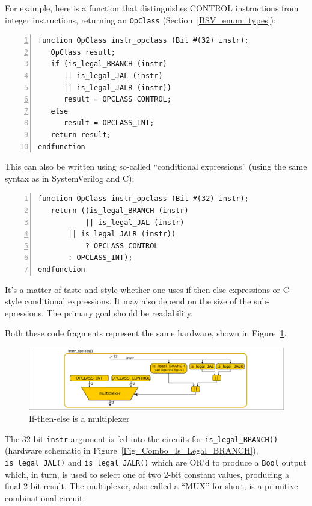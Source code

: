 For example, here is a function that distinguishes CONTROL
instructions from integer instructions, returning an \verb|OpClass|
(Section~\ref{BSV_enum_types}):

{\small
\begin{Verbatim}[frame=single, numbers=left]
function OpClass instr_opclass (Bit #(32) instr);
   OpClass result;
   if (is_legal_BRANCH (instr)
      || is_legal_JAL (instr)
      || is_legal_JALR (instr))
      result = OPCLASS_CONTROL;
   else
      result = OPCLASS_INT;
   return result;
endfunction
\end{Verbatim}
}

This can also be written using so-called ``conditional expressions''
(using the same syntax as in SystemVerilog and C):

{\small
\begin{Verbatim}[frame=single, numbers=left]
function OpClass instr_opclass (Bit #(32) instr);
   return ((is_legal_BRANCH (instr)
           || is_legal_JAL (instr)
	   || is_legal_JALR (instr))
           ? OPCLASS_CONTROL
	   : OPCLASS_INT);
endfunction
\end{Verbatim}
}

It's a matter of taste and style whether one uses if-then-else
expressions or C-style conditional expressions.  It may also depend on
the size of the sub-epressions.  The primary goal should be
readability.

Both these code fragments represent the same hardware, shown in
Figure~\ref{Fig_Combo_Multiplexer}.
\begin{figure}[htbp]
  \centerline{\includegraphics[width=6in,angle=0]{Figures/Fig_Combo_Multiplexer}}
  \caption{\label{Fig_Combo_Multiplexer}If-then-else is a multiplexer}
\end{figure}
The 32-bit \verb|instr| argument is fed into the circuits for
\verb|is_legal_BRANCH()| (hardware schematic in
Figure~\ref{Fig_Combo_Is_Legal_BRANCH}), \verb|is_legal_JAL()| and
\verb|is_legal_JALR()| which are OR'd to produce a \verb|Bool| output
which, in turn, is used to select one of two 2-bit constant values,
producing a final 2-bit result.  The multiplexer, also called a
``MUX'' for short, is a primitive combinational circuit.

